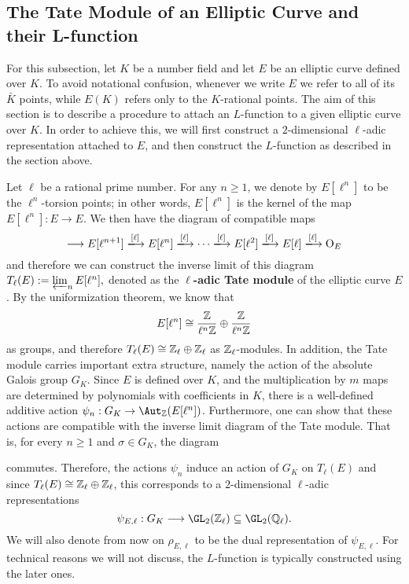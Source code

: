 
\subsection{The Tate Module of an Elliptic Curve and their L-function}
For this subsection, let $K$ be a number field and let $E$ be an elliptic curve defined over $K$. To avoid notational confusion, whenever we write $E$ we refer to all of its $\bar{K}$ points, while $E(K)$ refers only to the $K$-rational points. The aim of this section is to describe a procedure to attach an $L$-function to a given elliptic curve over $K$. In order to achieve this, we will first construct a $2$-dimensional $\ell$-adic representation attached to $E$, and then construct the $L$-function as described in the section above.

Let $\ell$ be a rational prime number. For any $n\geq1$, we denote by $E[\ell^n]$ to be the $\ell^n$-torsion points; in other words, $E[\ell^n]$ is the kernel of the map $E[\ell^n]:E\to E$. We then have the diagram of compatible maps
\[
    \longrightarrow E[\ell^{n+1}]\xlongrightarrow{[\ell]} E[\ell^{n}]\xlongrightarrow{[\ell]}\cdots\xlongrightarrow{[\ell]} E[\ell^2]\xlongrightarrow{[\ell]} E[\ell]\xlongrightarrow{[\ell]} \mathrm{O}_E 
\] 
and therefore we can construct the inverse limit of this diagram
$T_\ell(E):=\varprojlim_{n}E[\ell^n],$
denoted as the \textbf{$\ell$-adic Tate module} of the elliptic curve $E$. By the uniformization theorem, we know that 
$$E[\ell^n]\cong\frac{\mathbb{Z}}{\ell^n\mathbb{Z}}\oplus\frac{\mathbb{Z}}{\ell^n\mathbb{Z}}$$
as groups, and therefore 
$T_\ell(E)\cong\mathbb{Z}_\ell\oplus\mathbb{Z}_\ell$
as $\mathbb{Z}_\ell$-modules. In addition, the Tate module carries important extra structure, namely the action of the absolute Galois group $G_K$. Since $E$ is defined over $K$, and the multiplication by $m$ maps are determined by polynomials with coefficients in $K$, there is a well-defined additive action $\psi_n:G_K\rightarrow\Aut_{\ZZ}(E[\ell^n])$. Furthermore, one can show that these actions are compatible with the inverse limit diagram of the Tate module. That is, for every $n\geq 1$ and $\sigma\in G_K$, the diagram


\begin{center}
\end{center}
commutes. Therefore, the actions $\psi_n$ induce an action of $G_K$ on $T_\ell(E)$ and since $T_\ell(E)\cong\mathbb{Z}_\ell\oplus\mathbb{Z}_\ell$, this corresponds to a $2$-dimensional $\ell$-adic representations
$$\psi_{E,\ell}:G_K\longrightarrow \GL_2(\ZZ_\ell)\subseteq\GL_2(\QQ_\ell).$$
We will also denote from now on $\rho_{E,\ell}$ to be the dual representation of $\psi_{E,\ell}$. For technical reasons we will not discuss, the $L$-function is typically constructed using the later ones.

